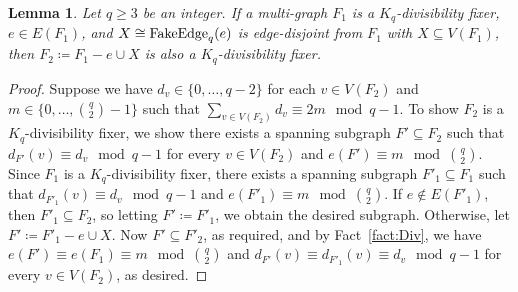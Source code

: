 \documentclass[11pt]{article}
\numberwithin{equation}{section}
\newcounter{i}
\theoremstyle{plain}
\newtheorem{lem}[thm]{Lemma}
\theoremstyle{plain} %
\theoremstyle{definition}
\begin{document}
\begin{lem}\label{lem:div-fixer-fake-edge}
    Let $q \geq 3$ be an integer. If a multi-graph $F_1$ is a $K_q$-divisibility fixer, $e \in E(F_1)$, and $X \cong {\rm FakeEdge}_q(e)$ is edge-disjoint from $F_1$ with $X \subseteq V(F_1)$, then $F_2 \coloneqq F_1 - e \cup X$ is also a $K_q$-divisibility fixer.
\end{lem}
\begin{proof}
    Suppose we have $d_v \in \{0, \dots, q - 2\}$ for each $v\in V(F_2)$ and $m \in \{0, \dots, \binom{q}{2}-1\}$ such that $\sum_{v\in V(F_2)}d_v \equiv 2m \mod q - 1$.  To show $F_2$ is a $K_q$-divisibility fixer, we show there exists a spanning subgraph $F' \subseteq F_2$ such that $d_{F'}(v) \equiv d_v \mod q - 1$ for every $v \in V(F_2)$ and $e(F') \equiv m \mod \binom{q}{2}$.
    Since $F_1$ is a $K_q$-divisibility fixer, there exists a spanning subgraph $F'_1 \subseteq F_1$ such that $d_{F'_1}(v) \equiv d_v \mod q - 1$ and $e(F'_1) \equiv m \mod \binom{q}{2}$.  If $e \notin E(F'_1)$, then $F'_1 \subseteq F_2$, so letting $F' \coloneqq F'_1$, we obtain the desired subgraph.  Otherwise, let $F' \coloneqq F'_1 - e \cup X$.  Now $F' \subseteq F'_2$, as required, and by Fact~\ref{fact:Div}, we have $e(F') \equiv e(F_1) \equiv m \mod \binom{q}{2}$ and $d_{F'}(v) \equiv d_{F'_1}(v) \equiv d_v \mod q - 1$ for every $v \in V(F_2)$, as desired.
\end{proof}
\end{document}
